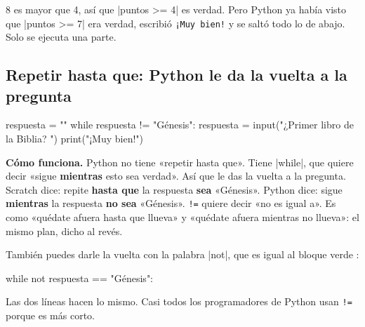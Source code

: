 \begin{think}
8 es mayor que 4, así que \py|puntos >= 4| es verdad. Pero Python ya había visto que \py|puntos >= 7| era verdad, escribió \texttt{¡Muy bien!} y se saltó todo lo de abajo. Solo se ejecuta una parte.
\end{think}

\subsection*{Repetir hasta que: Python le da la vuelta a la pregunta}

\begin{tcbraster}[raster columns=1, raster row skip=6pt]
\begin{tcolorbox}[colback=white, colframe=white, boxrule=0pt, valign=center, left=0pt, right=0pt]
\begin{scratch}
\end{scratch}
\end{tcolorbox}
\begin{code}
respuesta = ""
while respuesta != "Génesis":
    respuesta = input("¿Primer libro de la Biblia? ")
print("¡Muy bien!")
\end{code}
\end{tcbraster}

\textbf{Cómo funciona.} Python no tiene «repetir hasta que». Tiene \py|while|, que quiere decir «sigue \textbf{mientras} esto sea verdad». Así que le das la vuelta a la pregunta. Scratch dice: repite \textbf{hasta que} la respuesta \textbf{sea} «Génesis». Python dice: sigue \textbf{mientras} la respuesta \textbf{no sea} «Génesis». \texttt{!=} quiere decir «no es igual a». Es como «quédate afuera hasta que llueva» y «quédate afuera mientras no llueva»: el mismo plan, dicho al revés.

También puedes darle la vuelta con la palabra \py|not|, que es igual al bloque verde :
\begin{codenonum}
while not respuesta == "Génesis":
\end{codenonum}
Las dos líneas hacen lo mismo. Casi todos los programadores de Python usan \texttt{!=} porque es más corto.

